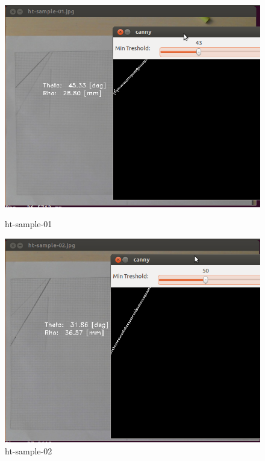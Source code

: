 \newpage
\begin{figure}
\centering
\begin{minipage}{.5\textwidth}
  \centering
  \includegraphics[width=.9\linewidth]{images/lab3-sample-01.png}
  \caption{ht-sample-01}
  \label{fig:test1}
\end{minipage}%
\begin{minipage}{.5\textwidth}
  \centering
  \includegraphics[width=.9\linewidth]{images/lab3-sample-02.png}
  \caption{ht-sample-02}
  \label{fig:test2}
\end{minipage}
\end{figure}

